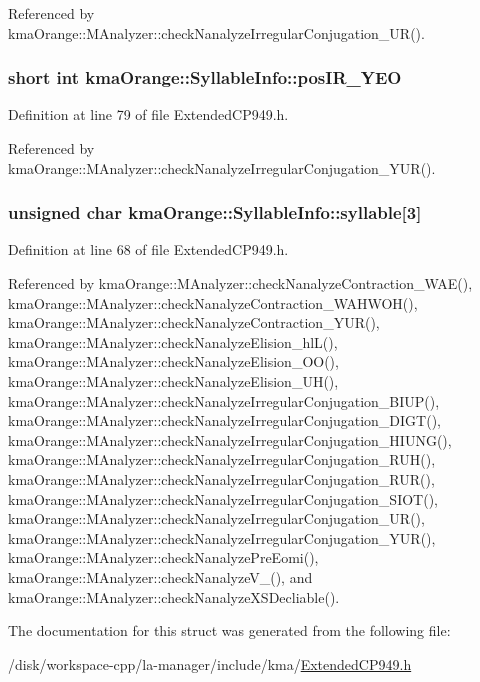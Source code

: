 Referenced by kmaOrange::MAnalyzer::checkNanalyzeIrregularConjugation\_\-UR().\hypertarget{structkmaOrange_1_1SyllableInfo_2be39bb82a8f8492fc51e449246b166d}{
\subsubsection[{posIR\_\-YEO}]{\setlength{\rightskip}{0pt plus 5cm}short int {\bf kmaOrange::SyllableInfo::posIR\_\-YEO}}}
\label{structkmaOrange_1_1SyllableInfo_2be39bb82a8f8492fc51e449246b166d}




Definition at line 79 of file ExtendedCP949.h.

Referenced by kmaOrange::MAnalyzer::checkNanalyzeIrregularConjugation\_\-YUR().\hypertarget{structkmaOrange_1_1SyllableInfo_4d670961ef45eec1dfc058d663203933}{
\subsubsection[{syllable}]{\setlength{\rightskip}{0pt plus 5cm}unsigned char {\bf kmaOrange::SyllableInfo::syllable}\mbox{[}3\mbox{]}}}
\label{structkmaOrange_1_1SyllableInfo_4d670961ef45eec1dfc058d663203933}




Definition at line 68 of file ExtendedCP949.h.

Referenced by kmaOrange::MAnalyzer::checkNanalyzeContraction\_\-WAE(), kmaOrange::MAnalyzer::checkNanalyzeContraction\_\-WAHWOH(), kmaOrange::MAnalyzer::checkNanalyzeContraction\_\-YUR(), kmaOrange::MAnalyzer::checkNanalyzeElision\_\-hlL(), kmaOrange::MAnalyzer::checkNanalyzeElision\_\-OO(), kmaOrange::MAnalyzer::checkNanalyzeElision\_\-UH(), kmaOrange::MAnalyzer::checkNanalyzeIrregularConjugation\_\-BIUP(), kmaOrange::MAnalyzer::checkNanalyzeIrregularConjugation\_\-DIGT(), kmaOrange::MAnalyzer::checkNanalyzeIrregularConjugation\_\-HIUNG(), kmaOrange::MAnalyzer::checkNanalyzeIrregularConjugation\_\-RUH(), kmaOrange::MAnalyzer::checkNanalyzeIrregularConjugation\_\-RUR(), kmaOrange::MAnalyzer::checkNanalyzeIrregularConjugation\_\-SIOT(), kmaOrange::MAnalyzer::checkNanalyzeIrregularConjugation\_\-UR(), kmaOrange::MAnalyzer::checkNanalyzeIrregularConjugation\_\-YUR(), kmaOrange::MAnalyzer::checkNanalyzePreEomi(), kmaOrange::MAnalyzer::checkNanalyzeV\_\-(), and kmaOrange::MAnalyzer::checkNanalyzeXSDecliable().

The documentation for this struct was generated from the following file:\begin{CompactItemize}
\item 
/disk/workspace-cpp/la-manager/include/kma/\hyperlink{ExtendedCP949_8h}{ExtendedCP949.h}\end{CompactItemize}
